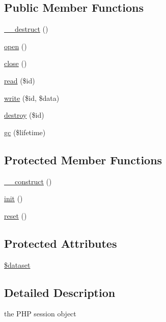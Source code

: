 \subsection*{Public Member Functions}
\begin{CompactItemize}
\item 
\hyperlink{classSessionHandler_461097c3ee6b1aecf833ce1225d02329}{\_\-\_\-destruct} ()
\item 
\hyperlink{classSessionHandler_50aa0b123f53d99de350a0eb02b4bfa5}{open} ()
\item 
\hyperlink{classSessionHandler_335ced83731c7e3e685b7e0df2989c79}{close} ()
\item 
\hyperlink{classSessionHandler_58cc3e5bf5b14e7bfbc73162de1f5d2b}{read} (\$id)
\item 
\hyperlink{classSessionHandler_b59071ef0d3deee2472c6916471bd9f5}{write} (\$id, \$data)
\item 
\hyperlink{classSessionHandler_4e43712ef307979de1b12039ef801adb}{destroy} (\$id)
\item 
\hyperlink{classSessionHandler_c33097332375ae3f8a43c31cef6db0e8}{gc} (\$lifetime)
\end{CompactItemize}
\subsection*{Protected Member Functions}
\begin{CompactItemize}
\item 
\hyperlink{classSessionHandler_546ba6d31a1ce532de13f65aadc3be0e}{\_\-\_\-construct} ()
\item 
\hyperlink{class__OWL_e0ef3ded56e8a6b34b6461e5a721cd3e}{init} ()
\item 
\hyperlink{class__OWL_2f2a042bcf31965194c03033df0edc9b}{reset} ()
\end{CompactItemize}
\subsection*{Protected Attributes}
\begin{CompactItemize}
\item 
\hyperlink{classSessionHandler_74c46fcfbadd4c4e6bacc73ddf350056}{\$dataset}
\end{CompactItemize}


\subsection{Detailed Description}
the PHP session object 

